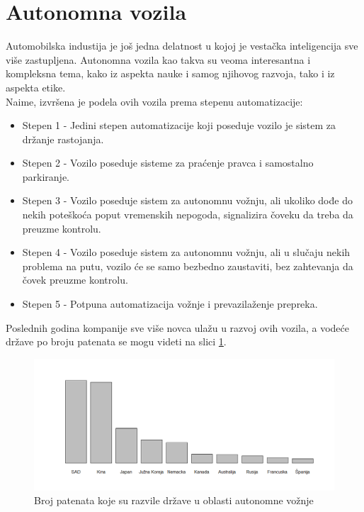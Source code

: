 \documentclass[a4paper]{article}
\begin{document}

\section{Autonomna vozila}
\label{sec:Autonomna vozila}
Automobilska industija je još jedna delatnost u kojoj je vestačka inteligencija sve više zastupljena. Autonomna vozila kao takva su veoma interesantna i kompleksna tema, kako iz aspekta nauke i samog njihovog razvoja, tako i iz aspekta etike. \\
Naime, izvršena je podela ovih vozila prema stepenu automatizacije:
\begin{itemize}
 \item {Stepen 1 - Jedini stepen automatizacije koji poseduje vozilo je sistem za           držanje rastojanja.}
 \item {Stepen 2 - Vozilo poseduje sisteme za praćenje pravca i samostalno                  parkiranje.}
 \item {Stepen 3 - Vozilo poseduje sistem za autonomnu vožnju, ali ukoliko dođe do          nekih poteškoća poput vremenskih nepogoda, signalizira čoveku da treba da         preuzme kontrolu.}
 \item {Stepen 4 - Vozilo poseduje sistem za autonomnu vožnju, ali u slučaju nekih              problema na putu, vozilo će se samo bezbedno zaustaviti, bez zahtevanja da        čovek preuzme kontrolu.}
 \item {Stepen 5 - Potpuna automatizacija vožnje i prevazilaženje prepreka.}
\end{itemize} 
Poslednih godina kompanije sve više novca ulažu u razvoj ovih vozila, a vodeće države po broju patenata se mogu videti na slici \ref{fig:histograma}.

\begin{figure}[h!]
\begin{center}
\includegraphics[scale=0.41]{slika.png}
\end{center}
\caption{Broj patenata koje su razvile države u oblasti autonomne vožnje \cite{vehicle_data}} 
\label{fig:histograma}
\end{figure} 
\end{document}
